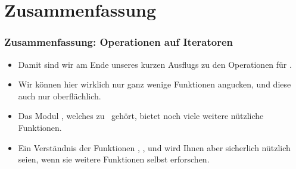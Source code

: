 \documentclass[aspectratio=169,mathserif,notheorems]{beamer}%
\begin{document}
\section{Zusammenfassung}%
%
\begin{frame}%
\frametitle{Zusammenfassung: Operationen auf Iteratoren}%
%
\begin{itemize}%
\item Damit sind wir am Ende unseres kurzen Ausflugs zu den Operationen für .%
%
\item<2-> Wir können hier wirklich nur ganz wenige Funktionen angucken, und diese auch nur oberflächlich.%
%
\item<3-> Das Modul \cite{PSF:P3D:TPSL:IFCIFEL}, welches zu \python\ gehört, bietet noch viele weitere nützliche Funktionen.%
%
\item<4-> Ein Verständnis der Funktionen , , und  wird Ihnen aber sicherlich nützlich seien, wenn sie weitere Funktionen selbst erforschen.%
\end{itemize}%
\end{frame}%
%
\end{document}
